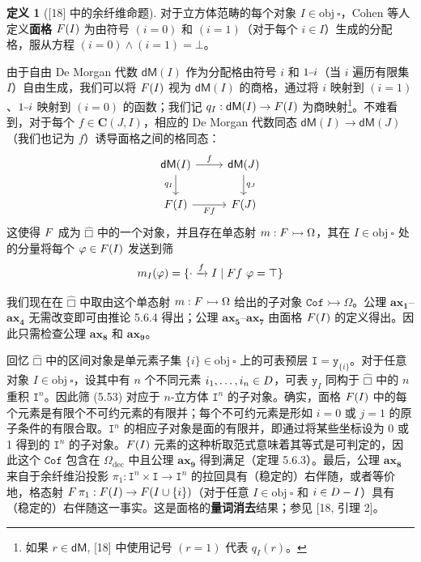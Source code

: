 \documentclass{ctexrep}
\let\mathbb\relax %
\theoremstyle{plain}
\theoremstyle{definition}
\newtheorem{definition}[theorem]{定义}
\theoremstyle{remark}
\newcommand\bbF{\mathbb{F}}
\newcommand\ttI{\mathtt{I}}
\newcommand\hatcube{\widehat{□}}
\newcommand{\ax}[1]{\mathbf{ax_{#1}}}
\newcommand{\mi}{{\rule[0.5ex]{0.4em}{0.4pt}}}
\begin{document}
\begin{definition}[{[18]} 中的余纤维命题]
对于立方体范畴的每个对象 $I \in \mathrm{obj}\ \square$，Cohen 等人定义\textbf{面格} $\mathbb{F}(I)$ 为由符号 $(i = 0)$ 和 $(i = 1)$（对于每个 $i \in I$）生成的分配格，服从方程 $(i = 0) \land (i = 1) = \bot$。

由于自由 De Morgan 代数 $\mathsf{dM}(I)$ 作为分配格由符号 $i$ 和 $1\mi i$（当 $i$ 遍历有限集 $I$）自由生成，我们可以将 $\mathbb{F}(I)$ 视为 $\mathsf{dM}(I)$ 的商格，通过将 $i$ 映射到 $(i = 1)$、$1\mi i$ 映射到 $(i = 0)$ 的函数；我们记 $q_I : \mathsf{dM}(I) \to \mathbb{F}(I)$ 为商映射\footnote{如果 $r\in\mathsf{dM}$, [18] 中使用记号 $(r=1)$ 代表 $q_{I}(r)$。}。不难看到，对于每个 $f \in \mathbf{C}(J, I)$，相应的 De Morgan 代数同态 $\mathsf{dM}(I) \to \mathsf{dM}(J)$（我们也记为 $f$）诱导面格之间的格同态：
\[
\begin{tikzcd}
\mathsf{dM}(I) \arrow[r,"f"] \arrow[d, "q_I"'] & \mathsf{dM}(J) \arrow[d, "q_J"] \\
\mathbb{F}(I) \arrow[r, "\mathbb{F}f"'] & \mathbb{F}(J)
\end{tikzcd}
\]
这使得 $\mathbb{F}$ 成为 $\hatcube$ 中的一个对象，并且存在单态射 $m : \mathbb{F} \rightarrowtail \Omega$，其在 $I \in \mathrm{obj}\ \square$ 处的分量将每个 $\varphi \in \mathbb{F}(I)$ 发送到筛
\begin{equation}
m_I(\varphi) = \{\cdot \xrightarrow{f} I \mid \mathbb{F}f\ \varphi = \top\}
\end{equation}

我们现在在 $\hatcube$ 中取由这个单态射 $m : \mathbb{F} \rightarrowtail \Omega$ 给出的子对象 $\mathtt{Cof} \rightarrowtail \Omega$。公理 $\ax{1}$--$\ax{4}$ 无需改变即可由推论 5.6.4 得出；公理 $\ax{5}$--$\ax{7}$ 由面格 $\mathbb{F}(I)$ 的定义得出。因此只需检查公理 $\ax{8}$ 和 $\ax{9}$。

回忆 $\hatcube$ 中的区间对象是单元素子集 $\{i\} \in \mathrm{obj}\ \square$ 上的可表预层 $\ttI = \mathtt{y}_{\{i\}}$。对于任意对象 $I \in \mathrm{obj}\ \square$，设其中有 $n$ 个不同元素 $i_1, \ldots, i_n \in \mathbb{D}$，可表 $\mathtt{y}_I$ 同构于 $\hatcube$ 中的 $n$ 重积 $\ttI^n$。因此筛 (5.53) 对应于 $n$-立方体 $\ttI^n$ 的子对象。确实，面格 $\mathbb{F}(I)$ 中的每个元素是有限个不可约元素的有限并；每个不可约元素是形如 $i = 0$ 或 $j = 1$ 的原子条件的有限合取。$\ttI^n$ 的相应子对象是面的有限并，即通过将某些坐标设为 0 或 1 得到的 $\ttI^n$ 的子对象。$\mathbb{F}(I)$ 元素的这种析取范式意味着其等式是可判定的，因此这个 $\mathtt{Cof}$ 包含在 $\Omega_{\mathrm{dec}}$ 中且公理 $\ax{9}$ 得到满足（定理 5.6.3）。最后，公理 $\ax{8}$ 来自于余纤维沿投影 $\pi_1 : \ttI^n \times \ttI \to \ttI^n$ 的拉回具有（稳定的）右伴随，或者等价地，格态射 $\bbF\,\pi_1 : \mathbb{F}(I) \to \mathbb{F}(I \cup \{i\})$（对于任意 $I \in \mathrm{obj}\ \square$ 和 $i \in \mathbb{D} - I$）具有（稳定的）右伴随这一事实。这是面格的\textbf{量词消去}结果；参见 [18, 引理 2]。
\end{definition}
\end{document}
